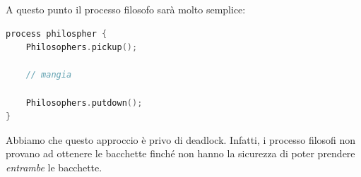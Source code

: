 \documentclass[a4paper,11pt]{article}
\begin{document}
A questo punto il processo filosofo sarà molto semplice:
\begin{lstlisting}[language=C++, style=codestyle]	
process philospher {
	Philosophers.pickup();
	
	// mangia
	
	Philosophers.putdown();
}
\end{lstlisting}

Abbiamo che questo approccio è privo di deadlock. Infatti, i processo filosofi non provano ad ottenere le bacchette finché non hanno la sicurezza di poter prendere \textit{entrambe} le bacchette.
\end{document}
